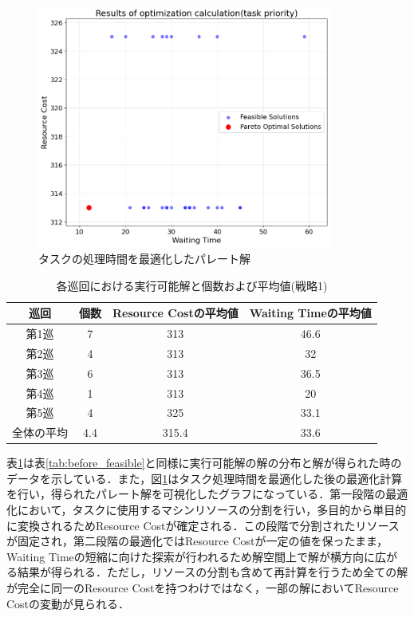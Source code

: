 \begin{figure}[H]
    \centering
    \includegraphics[width=0.8\linewidth, height=8cm]{./images/task_job5.png}
    \caption{タスクの処理時間を最適化したパレート解}
    \label{fig:fig6}
\end{figure}

\begin{table}[ht]
    \centering
    \vspace{-0.3cm}
    \caption{各巡回における実行可能解と個数および平均値(戦略1)}
    \begin{tabular}{|c|c|c|c|}
        \hline
         巡回 & 個数 & Resource Costの平均値 & Waiting Timeの平均値 \\
        \hline
        第1巡 & 7 & 313 & 46.6 \\
        \hline
        第2巡 & 4 & 313 & 32 \\
        \hline
        第3巡 & 6 & 313 & 36.5 \\
        \hline
        第4巡 & 1 & 313 & 20 \\
        \hline
        第5巡 & 4 & 325 & 33.1 \\
        \hline
        全体の平均 & 4.4 & 315.4 & 33.6 \\
        \hline
    \end{tabular}
    \label{tab:task_feasible}
\end{table}

表\ref{tab:task_feasible}は表\ref{tab:before_feasible}と同様に実行可能解の解の分布と解が得られた時のデータを示している．また，図\ref{fig:fig6}はタスク処理時間を最適化した後の最適化計算を行い，得られたパレート解を可視化したグラフになっている．第一段階の最適化において，タスクに使用するマシンリソースの分割を行い，多目的から単目的に変換されるためResource Costが確定される．この段階で分割されたリソースが固定され，第二段階の最適化ではResource Costが一定の値を保ったまま，Waiting Timeの短縮に向けた探索が行われるため解空間上で解が横方向に広がる結果が得られる．ただし，リソースの分割も含めて再計算を行うため全ての解が完全に同一のResource Costを持つわけではなく，一部の解においてResource Costの変動が見られる．

